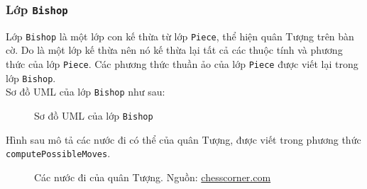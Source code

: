 \subsubsection{Lớp \lstinline{Bishop}}
Lớp \lstinline{Bishop} là một lớp con kế thừa từ lớp \lstinline{Piece}, thể hiện quân Tượng trên bàn cờ. Do là một lớp kế thừa nên nó kế thừa lại tất cả các thuộc tính và phương thức của lớp \lstinline{Piece}. Các phương thức thuần ảo của lớp \lstinline{Piece} được viết lại trong lớp \lstinline{Bishop}.\\
Sơ đồ UML của lớp \lstinline{Bishop} như sau:
\begin{figure}[H]
\caption{Sơ đồ UML của lớp \lstinline{Bishop}}
\end{figure}
Hình sau mô tả các nước đi có thể của quân Tượng, được viết trong phương thức \lstinline{computePossibleMoves}.
\begin{figure}[H]
\caption{Các nước đi của quân Tượng. Nguồn: \url{chesscorner.com}}
\end{figure}


